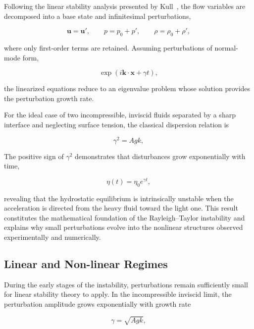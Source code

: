Following the linear stability analysis presented by Kull~\cite{KULL1991197}, the flow variables are decomposed into a base state and infinitesimal perturbations,

\begin{equation}
\mathbf{u}=\mathbf{u}',
\qquad
p=p_0+p',
\qquad
\rho=\rho_0+\rho',
\end{equation}

where only first-order terms are retained. Assuming perturbations of normal-mode form,

\begin{equation}
\exp\left(i\mathbf{k}\cdot\mathbf{x}+\gamma t\right),
\end{equation}

the linearized equations reduce to an eigenvalue problem whose solution provides the perturbation growth rate.

For the ideal case of two incompressible, inviscid fluids separated by a sharp interface and neglecting surface tension, the classical dispersion relation is

\begin{equation}
\gamma^2=Agk,
\end{equation}

The positive sign of $\gamma^2$ demonstrates that disturbances grow exponentially with time,

\begin{equation}
\eta(t)=\eta_0e^{\gamma t},
\end{equation}

revealing that the hydrostatic equilibrium is intrinsically unstable when the acceleration is directed from the heavy fluid toward the light one. This result constitutes the mathematical foundation of the Rayleigh--Taylor instability and explains why small perturbations evolve into the nonlinear structures observed experimentally and numerically.




\subsection{Linear and Non-linear Regimes}

During the early stages of the instability, perturbations remain sufficiently small for linear stability theory to apply. In the incompressible inviscid limit, the perturbation amplitude grows exponentially with growth rate~\citep[p.~23]{zhou2017rti1}

\[
\gamma = \sqrt{A g k},
\]


